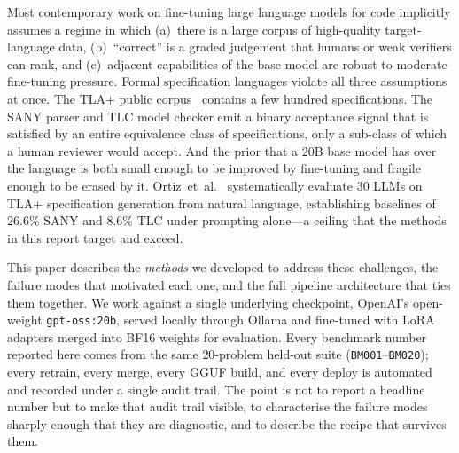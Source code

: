 \documentclass[11pt]{article}
\begin{document}
Most contemporary work on fine-tuning large language models for code
implicitly assumes a regime in which (a)~there is a large corpus of
high-quality target-language data, (b)~``correct'' is a graded judgement
that humans or weak verifiers can rank, and (c)~adjacent capabilities of
the base model are robust to moderate fine-tuning pressure. Formal
specification languages violate all three assumptions at once. The TLA+
public corpus~\cite{lamport2002specifying} contains a few hundred
specifications. The SANY parser and TLC model checker emit a binary
acceptance signal that is satisfied by an entire equivalence class of
specifications, only a sub-class of which a human reviewer would accept.
And the prior that a $20$B base model has over the language is both small
enough to be improved by fine-tuning and fragile enough to be erased by
it. Ortiz~et~al.~\cite{ortiz2026formallm} systematically evaluate $30$
LLMs on TLA+ specification generation from natural language, establishing
baselines of $26.6\%$ SANY and $8.6\%$ TLC under prompting alone---a
ceiling that the methods in this report target and exceed.

This paper describes the \emph{methods} we developed to address these
challenges, the failure modes that motivated each one, and the full
pipeline architecture that ties them together. We work against a single underlying
checkpoint, OpenAI's open-weight \texttt{gpt-oss:20b}, served locally
through Ollama and fine-tuned with LoRA adapters merged into BF16 weights
for evaluation. Every benchmark number reported here comes from the same
$20$-problem held-out suite (\texttt{BM001}--\texttt{BM020}); every retrain,
every merge, every GGUF build, and every deploy is automated and recorded
under a single audit trail. The point is not to report a headline number
but to make that audit trail visible, to characterise the failure modes
sharply enough that they are diagnostic, and to describe the recipe that
survives them.
\end{document}
